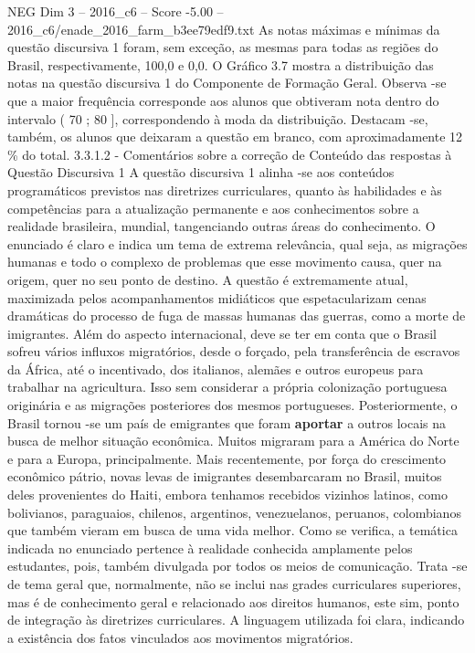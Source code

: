 \begin{textsample}{NEG Dim 3 – 2016\_c6 – Score -5.00 – 2016\_c6/enade\_2016\_farm\_b3ee79edf9.txt}
As notas máximas e mínimas da questão discursiva 1 foram, sem exceção, as mesmas para todas as regiões do Brasil, respectivamente, 100,0 e 0,0.
O Gráfico 3.7 mostra a distribuição das notas na questão discursiva 1 do Componente de Formação Geral.
Observa -se que a maior frequência corresponde aos alunos que obtiveram nota dentro do intervalo ( 70 ; 80 ], correspondendo à moda da distribuição.
Destacam -se, também, os alunos que deixaram a questão em branco, com aproximadamente 12 \% do total. 3.3.1.2 - Comentários sobre a correção de Conteúdo das respostas à Questão Discursiva 1 A questão discursiva 1 alinha -se aos conteúdos programáticos previstos nas diretrizes curriculares, quanto às habilidades e às competências para a atualização permanente e aos conhecimentos sobre a realidade brasileira, mundial, tangenciando outras áreas do conhecimento.
O enunciado é claro e indica um tema de extrema relevância, qual seja, as migrações humanas e todo o complexo de problemas que esse movimento causa, quer na origem, quer no seu ponto de destino.
A questão é extremamente atual, maximizada pelos acompanhamentos midiáticos que espetacularizam cenas dramáticas do processo de fuga de massas humanas das guerras, como a morte de imigrantes.
Além do aspecto internacional, deve se ter em conta que o Brasil sofreu vários influxos migratórios, desde o forçado, pela transferência de escravos da África, até o incentivado, dos italianos, alemães e outros europeus para trabalhar na agricultura.
Isso sem considerar a própria colonização portuguesa originária e as migrações posteriores dos mesmos portugueses.
Posteriormente, o Brasil tornou -se um país de emigrantes que foram \textbf{aportar} a outros locais na busca de melhor situação econômica.
Muitos migraram para a América do Norte e para a Europa, principalmente.
Mais recentemente, por força do crescimento econômico pátrio, novas levas de imigrantes desembarcaram no Brasil, muitos deles provenientes do Haiti, embora tenhamos recebidos vizinhos latinos, como bolivianos, paraguaios, chilenos, argentinos, venezuelanos, peruanos, colombianos que também vieram em busca de uma vida melhor.
Como se verifica, a temática indicada no enunciado pertence à realidade conhecida amplamente pelos estudantes, pois, também divulgada por todos os meios de comunicação.
Trata -se de tema geral que, normalmente, não se inclui nas grades curriculares superiores, mas é de conhecimento geral e relacionado aos direitos humanos, este sim, ponto de integração às diretrizes curriculares.
A linguagem utilizada foi clara, indicando a existência dos fatos vinculados aos movimentos migratórios.

\end{textsample}
